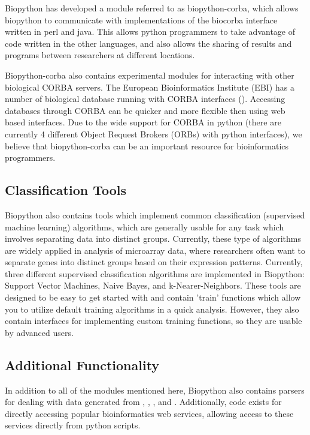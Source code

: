 \documentclass[dvips]{article}
\begin{document}
Biopython has developed a module referred to as biopython-corba, which allows biopython to communicate with implementations of the biocorba interface written in perl and java. This allows python programmers to take advantage of code written in the other languages, and also allows the sharing of results and programs between researchers at different locations.


Biopython-corba also contains experimental modules for interacting with other biological CORBA servers. The European Bioinformatics Institute (EBI) has a number of biological database running with CORBA interfaces (). Accessing databases through CORBA can be quicker and more flexible then using web based interfaces. Due to the wide support for CORBA in python (there are currently 4 different Object Request Brokers (ORBs) with python interfaces), we believe that biopython-corba can be an important resource for bioinformatics programmers.


\subsection{Classification Tools}


Biopython also contains tools which implement common classification (supervised machine learning) algorithms, which are generally usable for any task which involves separating data into distinct groups. Currently, these type of algorithms are widely applied in analysis of microarray data, where researchers often want to separate genes into distinct groups based on their expression patterns. Currently, three different supervised classification algorithms are implemented in Biopython: Support Vector Machines, Naive Bayes, and k-Nearer-Neighbors. These tools are designed to be easy to get started with and contain 'train' functions which allow you to utilize default training algorithms in a quick analysis. However, they also contain interfaces for implementing custom training functions, so they are usable by advanced users.

\subsection{Additional Functionality}

In addition to all of the modules mentioned here, Biopython also contains parsers for dealing with data generated from , , ,  and . Additionally, code exists for directly accessing popular bioinformatics web services, allowing access to these services directly from python scripts.
\end{document}
